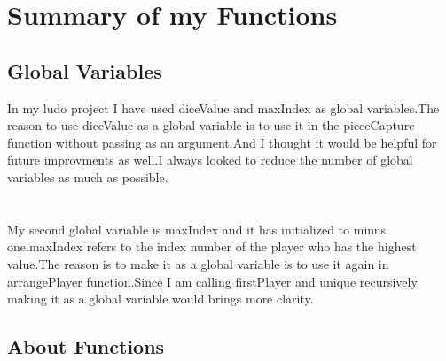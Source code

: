 \documentclass[a4paper,12pt]{article}
\begin{document}
\section{Summary of my Functions}
\subsection{Global Variables}

In my ludo project I have used diceValue and maxIndex as global variables.The reason to use diceValue as a global variable is to use it in the pieceCapture function without passing as an argument.And I thought it would be helpful for future improvments as well.I always looked to reduce the number of global variables as much as possible.\\ \\ \\
My second global variable is maxIndex and it has initialized to minus one.maxIndex refers to the index number of the player who has the highest value.The reason is to make it as a global variable is to use it again in arrangePlayer function.Since I am calling firstPlayer and unique recursively making it as a global variable would brings more clarity.\\



\subsection{About Functions}
\end{document}

